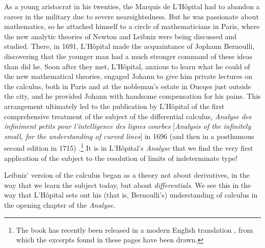 \message{ !name(LHopitalsRule_2021.03.29.tex)}\documentclass[11pt]{article}
\begin{document}
As a young aristocrat in his twenties, the Marquis de L'H\^opital had to abandon a career in the military due to severe nearsightedness. But he was passionate about mathematics, so he attached himself to a circle of mathematicians in Paris, where the new analytic theories of Newton and Leibniz were being discussed and studied. There, in 1691, L'H\^opital made the acquaintance of Jophann Bernoulli, discovering that the younger man had a much stronger command of these ideas than did he. Soon after they met, L'H\^opital, anxious to learn what he could of the new mathematical theories, engaged Johann to give him private lectures on the calculus, both in Paris and at the nobleman's estate in Oucqes just outside the city, and he provided Johann with handsome compensation for his pains. This arrangement ultimately led to the publication by L'H\^opital of the first comprehensive treatment of the subject of the differential calculus, \emph{Analyse des infiniment petits pour l'intelligence des lignes courbes} [\emph{Analysis of the infinitely small, for the understanding of curved lines}] in 1696 (and then in a posthumous second edition in 1715) \citep{LHopital}.\footnote{The book has recently been released in a modern English translation \citep{Bradley}, from which the excerpts found in these pages have been drawn.} It is in L'H\^opital's \emph{Analyse} that we find the very first application of the subject to the resolution of limits of indeterminate type!

Leibniz' version of the calculus began as a theory not about derivatives, in the way that we learn the subject today, but about \emph{differentials}. We see this in the way that L'H\^opital sets out his (that is, Bernoulli's) understanding of calculus in the opening chapter of the \emph{Analyse}.
\end{document}
